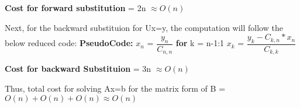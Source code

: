 \documentclass{article}
\newcommand\pseudoCode{\vspace{.10in}\textbf{PseudoCode: }}
\begin{document}
 \textbf {Cost for forward substitution} = 2n $\approx  O(n)$ \newline

Next, for the backward substituion for Ux=y, the computation will follow the below reduced code: \newline
\pseudoCode \newline
  $x_{n}$ = $\dfrac{y_{n}}{C_{n,n}}$ \newline
  \textbf {for} k = n-1:1 \newline
   \hspace*{0.5cm} $x_{k}$ = $\dfrac{y_{k} - C_{k,n}*x_{n}}{C_{k,k}}$ \newline

\textbf {Cost for backward Substituion} = 3n $\approx O(n)$

Thus, total cost for solving Ax=b for the matrix form of B = $O(n) + O(n) + O(n) \approx O(n)$
\end{document}
